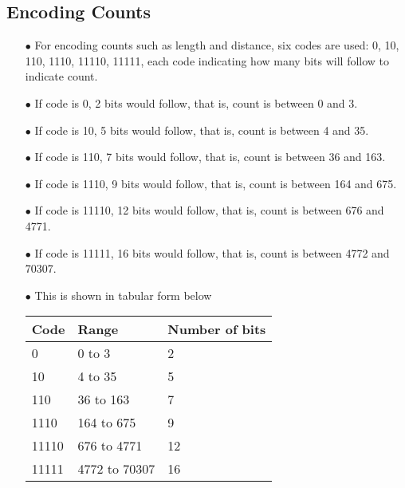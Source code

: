 \documentclass[]{article}
\begin{document}
\subsection{Encoding Counts}
\begin{itemize}
	\item[$\bullet$] For encoding counts such as length and distance, six codes are used: 0, 10, 110, 1110, 11110, 11111, each code indicating how many bits will follow to indicate count.
	\item[$\bullet$] If code is 0, 2 bits would follow, that is, count is between 0 and 3.
	\item[$\bullet$] If code is 10, 5 bits would follow, that is, count is between 4 and 35.
	\item[$\bullet$] If code is 110, 7 bits would follow, that is, count is between 36 and 163.
	\item[$\bullet$] If code is 1110, 9 bits would follow, that is, count is between 164 and 675.
	\item[$\bullet$] If code is 11110, 12 bits would follow, that is, count is between 676 and 4771.
	\item[$\bullet$] If code is 11111, 16 bits would follow, that is, count is between 4772 and 70307.
	\item[$\bullet$] This is shown in tabular form below
	\item[] \begin{tabular}{ | l | l | l |} \hline
	﻿\textbf{Code} & ﻿\textbf{Range} & ﻿\textbf{Number of bits} \\ \hline
	0 & 0 to 3 & 2 \\ \hline
	10 & 4 to 35 & 5 \\ \hline
	110 & 36 to 163 & 7 \\ \hline
	1110 & 164 to 675 & 9 \\ \hline
	11110 & 676 to 4771 & 12 \\ \hline
	11111 & 4772 to 70307 & 16 \\ \hline
\end{tabular}
\end{itemize}
\end{document}
